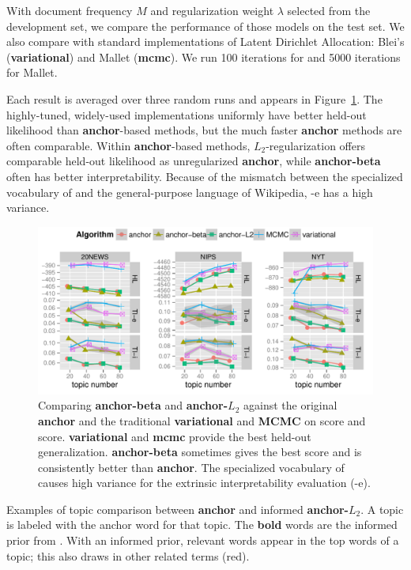 With document frequency $M$ and regularization weight $\lambda$
selected from the development set, we compare the performance of those
models on the test set.  We also compare with standard implementations
of Latent Dirichlet Allocation: Blei's  ({\bf variational}) and
Mallet ({\bf mcmc}).  We run 100 iterations for  and 5000
iterations for Mallet.

Each result is averaged over three random runs and appears in
Figure~\ref{fig:results}.  The highly-tuned, widely-used implementations
uniformly have better held-out likelihood than {\bf anchor}-based methods, but
the much faster {\bf anchor} methods are often comparable.  Within {\bf
  anchor}-based methods, $L_2$-regularization offers comparable held-out
likelihood as unregularized {\bf anchor}, while {\bf anchor-beta} often has
better interpretability.  Because of the mismatch between the specialized
vocabulary of  and the general-purpose language of Wikipedia,
-e has a high variance.

\begin{figure}[t]
\centering
\includegraphics[width=\linewidth]{2014_acl_reganchor/figures/results_option3}
\caption{Comparing {\bf anchor-beta} and {\bf anchor-$L_2$} against
  the original {\bf anchor} and the traditional {\bf variational} and
  {\bf MCMC} on  score and  score.  {\bf variational}
  and {\bf mcmc} provide the best held-out generalization.  {\bf
    anchor-beta} sometimes gives the best  score and is
  consistently better than {\bf anchor}.  The specialized vocabulary
  of  causes high variance for the extrinsic
  interpretability evaluation (-e).}
\label{fig:results}
\end{figure}

\begin{table}[t!]
\begin{small}
   \begin{center}



   \end{center}
\end{small}
\caption{Examples of topic comparison between {\bf anchor} and informed {\bf
    anchor-$L_2$}. A topic is labeled with the anchor word for that topic. The
  {\bf bold} words are the informed prior from . With an informed
  prior, relevant words appear in the top words of a topic; this also draws
  in other related terms (red). }
\label{tab:compare-informed}
\end{table}

